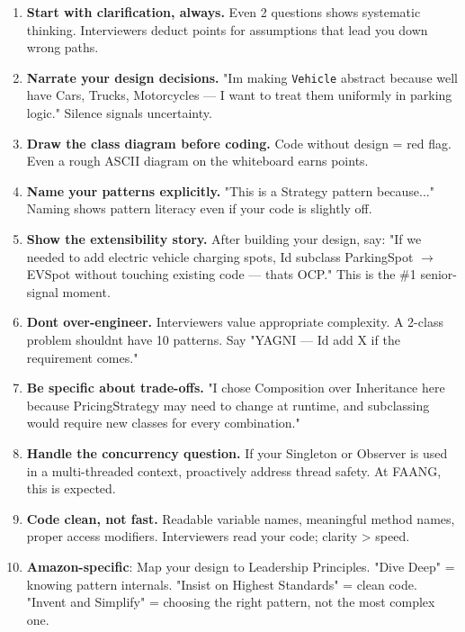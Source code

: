\documentclass[11pt]{article}
\begin{document}
\begin{enumerate}
\def\labelenumi{\arabic{enumi}.}
\item
  \textbf{Start with clarification, always.} Even 2 questions shows systematic thinking. Interviewers deduct points for assumptions that lead you down wrong paths.
\item
  \textbf{Narrate your design decisions.} "I\textquotesingle m making \texttt{Vehicle} abstract because we\textquotesingle ll have Cars, Trucks, Motorcycles --- I want to treat them uniformly in parking logic." Silence signals uncertainty.
\item
  \textbf{Draw the class diagram before coding.} Code without design = red flag. Even a rough ASCII diagram on the whiteboard earns points.
\item
  \textbf{Name your patterns explicitly.} "This is a Strategy pattern because..." Naming shows pattern literacy even if your code is slightly off.
\item
  \textbf{Show the extensibility story.} After building your design, say: "If we needed to add electric vehicle charging spots, I\textquotesingle d subclass ParkingSpot \(\rightarrow\) EVSpot without touching existing code --- that\textquotesingle s OCP." This is the \#1 senior-signal moment.
\item
  \textbf{Don\textquotesingle t over-engineer.} Interviewers value appropriate complexity. A 2-class problem shouldn\textquotesingle t have 10 patterns. Say "YAGNI --- I\textquotesingle d add X if the requirement comes."
\item
  \textbf{Be specific about trade-offs.} "I chose Composition over Inheritance here because PricingStrategy may need to change at runtime, and subclassing would require new classes for every combination."
\item
  \textbf{Handle the concurrency question.} If your Singleton or Observer is used in a multi-threaded context, proactively address thread safety. At FAANG, this is expected.
\item
  \textbf{Code clean, not fast.} Readable variable names, meaningful method names, proper access modifiers. Interviewers read your code; clarity \textgreater{} speed.
\item
  \textbf{Amazon-specific}: Map your design to Leadership Principles. "Dive Deep" = knowing pattern internals. "Insist on Highest Standards" = clean code. "Invent and Simplify" = choosing the right pattern, not the most complex one.
\end{enumerate}
\end{document}
